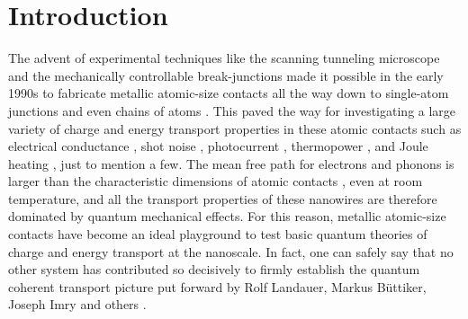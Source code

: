 \documentclass[aps,amsmath,amssymb,twocolumn,showpacs]{revtex4-1}
\begin{document}
\maketitle


\section{Introduction}
The advent of experimental techniques like the scanning tunneling microscope
and the mechanically controllable break-junctions made it possible in the
early 1990s to fabricate metallic atomic-size contacts all the way down to
single-atom junctions and even chains of atoms \cite{Agrait2003,Cuevas2017}.
This paved the way for investigating a large variety of charge and energy
transport properties in these atomic contacts such as electrical conductance
\cite{Krans1995,Scheer1998}, shot noise
\cite{Brom1999,Wheeler2010,Chen2012,Vardimon2016}, photocurrent
\cite{Guhr2007,Viljas2007,Ittah2009,Ward2010}, thermopower
\cite{Ludoph1999,Tsutsui2013,Evangeli2015,Ofarim2016}, and Joule heating
\cite{Lee2013,Zotti2014}, just to mention a few. The mean free
  path for electrons and phonons is larger than the characteristic dimensions
  of atomic contacts \cite{Ashcroft1976}, even at room temperature, and all
the transport properties of these nanowires are therefore dominated by quantum
mechanical effects. For this reason, metallic atomic-size contacts have become
an ideal playground to test basic quantum theories of charge and energy
transport at the nanoscale. In fact, one can safely say that no other system
has contributed so decisively to firmly establish the quantum coherent
transport picture put forward by Rolf Landauer, Markus B\"uttiker, Joseph Imry
and others \cite{Agrait2003,Cuevas2017,Buttiker1985,Buttiker1986,Imry1999}.
\end{document}
